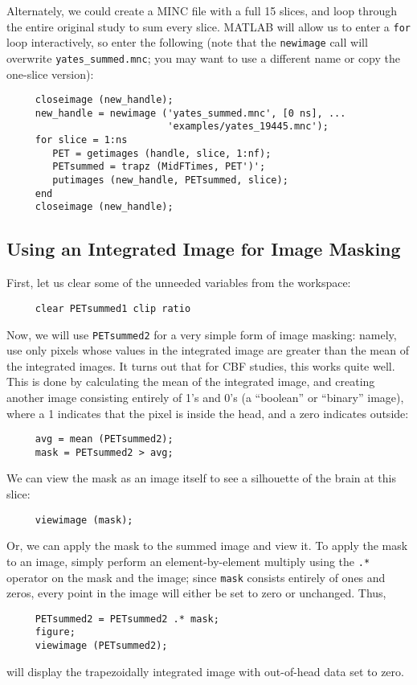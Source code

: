 Alternately, we could create a MINC file with a full 15 slices, and
loop through the entire original study to sum every slice.  MATLAB
will allow us to enter a \verb|for| loop interactively, so enter the
following (note that the \verb|newimage| call will overwrite
\verb|yates_summed.mnc|; you may want to use a different name or copy
the one-slice version):
\begin{verbatim}
     closeimage (new_handle);
     new_handle = newimage ('yates_summed.mnc', [0 ns], ...
                            'examples/yates_19445.mnc');
     for slice = 1:ns
        PET = getimages (handle, slice, 1:nf);
        PETsummed = trapz (MidFTimes, PET')';
        putimages (new_handle, PETsummed, slice);
     end
     closeimage (new_handle);
\end{verbatim}

\subsection{Using an Integrated Image for Image Masking}

First, let us clear some of the unneeded variables from the workspace:
\begin{verbatim}
     clear PETsummed1 clip ratio
\end{verbatim}
Now, we will use \verb|PETsummed2| for a very simple form of image
masking: namely, use only pixels whose values in the integrated image
are greater than the mean of the integrated images.  It turns out that
for CBF studies, this works quite well.  This is done by calculating
the mean of the integrated image, and creating another image
consisting entirely of 1's and 0's (a ``boolean'' or ``binary''
image), where a 1 indicates that the pixel is inside the head, and a
zero indicates outside:
\begin{verbatim}
     avg = mean (PETsummed2);
     mask = PETsummed2 > avg;
\end{verbatim}
We can view the mask as an image itself to see a silhouette of the
brain at this slice:
\begin{verbatim}
     viewimage (mask);
\end{verbatim}
Or, we can apply the mask to the summed image and view it.  To apply
the mask to an image, simply perform an element-by-element multiply 
using the
\verb|.*| operator on the mask and the image; since \verb|mask|
consists entirely of ones and zeros, every point in the image will
either be set to zero or unchanged.  Thus,
\begin{verbatim}
     PETsummed2 = PETsummed2 .* mask;
     figure;
     viewimage (PETsummed2);
\end{verbatim}
will display the trapezoidally integrated image with out-of-head data
set to zero.

